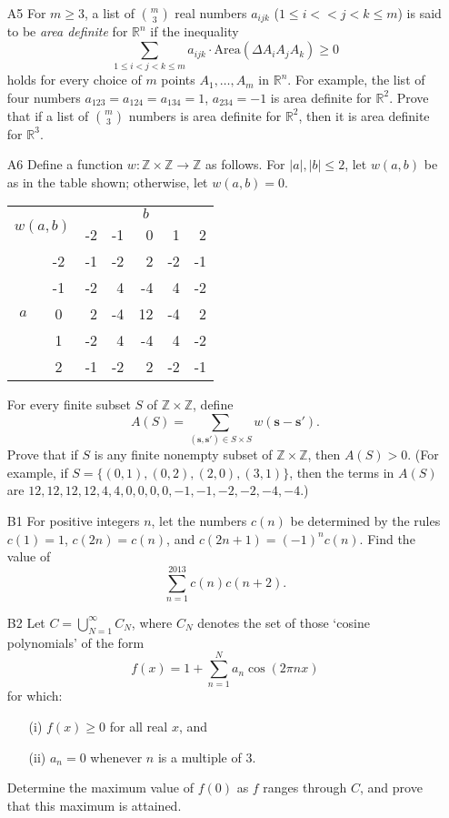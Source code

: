 \documentclass[amssymb,twocolumn,pra,10pt,aps]{revtex4-1}
\begin{document}
\begin{itemize}
\item[A5]
For $m \geq 3$, a list of $\binom{m}{3}$ real numbers $a_{ijk}$ ($1 \leq i < < j < k \leq m$) is said to be \emph{area definite} for $\mathbb{R}^n$ if the inequality
\[
\sum_{1 \leq i < j < k \leq m} a_{ijk} \cdot \mathrm{Area}(\Delta A_i A_j A_k) \geq 0
\]
holds for every choice of $m$ points $A_1,\dots,A_m$ in $\mathbb{R}^n$.
For example, the list of four numbers $a_{123} = a_{124} = a_{134} = 1$, $a_{234} = -1$ is area definite for $\mathbb{R}^2$. Prove that if a list of $\binom{m}{3}$ numbers is area definite for $\mathbb{R}^2$,
then it is area definite for $\mathbb{R}^3$.

\item[A6]
Define a function $w: \mathbb{Z} \times \mathbb{Z} \to \mathbb{Z}$
as follows. For $\left| a \right|, \left| b \right| \leq 2$,
let $w(a,b)$ be as in the table shown; otherwise, let $w(a,b) = 0$.
\begin{center}
\begin{tabular}{|cc|r|r|r|r|r|}
\hline
\multicolumn{2}{|c|}{\multirow{2}{*}{$w(a,b)$}} & \multicolumn{5}{|c|}{$b$} \\
&  & -2 & -1 & 0 & 1 & 2 \\
\hline
& -2 & -1 & -2 & 2 & -2 & -1 \\
& -1 & -2 & 4 & -4 & 4 & -2 \\
$a$ & 0 & 2 & -4 & 12 & -4 & 2 \\
& 1 & -2 & 4 & -4 & 4 & -2 \\ 
& 2 &  -1 & -2 & 2 & -2 & -1 \\
\hline
\end{tabular}
\end{center}
For every finite subset $S$ of $\mathbb{Z} \times \mathbb{Z}$,
define
\[
A(S) = \sum_{(\mathbf{s}, \mathbf{s}') \in S \times S} w(\mathbf{s} - \mathbf{s}').
\]
Prove that if $S$ is any finite nonempty subset of $\mathbb{Z} \times \mathbb{Z}$, then $A(S) > 0$.
(For example, if $S = \{(0,1), (0,2), (2,0), (3,1)\}$, then the terms in $A(S)$ are $12, 12, 12, 12, 4, 4, 0, 0, 0,0,-1,-1,-2,-2,-4,-4$.)

\item[B1]
For positive integers $n$, let the numbers $c(n)$ be determined by 
the rules $c(1) = 1$, $c(2n) = c(n)$, and $c(2n+1) = (-1)^n c(n)$.
Find the value of 
\[
\sum_{n=1}^{2013} c(n) c(n+2).
\]

\item[B2]
Let $C = \bigcup_{N=1}^\infty C_N$, where $C_N$ denotes the set of those `cosine polynomials' of the form
\[
f(x) = 1 + \sum_{n=1}^N a_n \cos(2 \pi n x)
\]
for which:
\begin{enumerate}
\item[(i)]
$f(x) \geq 0$ for all real $x$, and
\item[(ii)]
$a_n = 0$ whenever $n$ is a multiple of $3$.
\end{enumerate}
Determine the maximum value of $f(0)$ as $f$ ranges through $C$, and 
prove that this maximum is attained.


\end{itemize}
\end{document}
